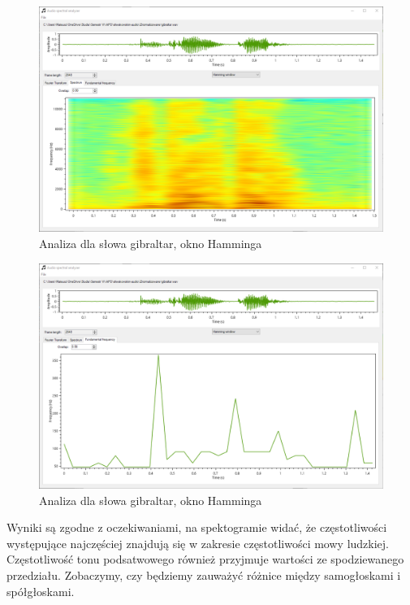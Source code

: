 \documentclass{article}
\begin{document}
\begin{figure}[H]
\includegraphics[width=6in]{scr10.png}
\centering
\caption{Analiza dla słowa gibraltar, okno Hamminga}
\end{figure}

\begin{figure}[H]
\includegraphics[width=6in]{scr11.png}
\centering
\caption{Analiza dla słowa gibraltar, okno Hamminga}
\end{figure}

Wyniki są zgodne z oczekiwaniami, na spektogramie widać, że częstotliwości występujące najczęściej znajdują się w zakresie częstotliwości mowy ludzkiej. Częstotliwość tonu podsatwowego również przyjmuje wartości ze spodziewanego przedziału. Zobaczymy, czy będziemy zauważyć różnice między samogłoskami i spółgłoskami.
\end{document}
